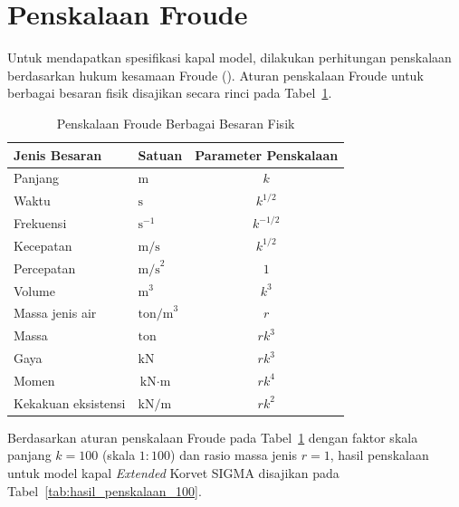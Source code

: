 \documentclass{article}
\providecommand{\parencite}[1]{(\cite{#1})}
\begin{document}
\section{Penskalaan Froude}

Untuk mendapatkan spesifikasi kapal model, dilakukan perhitungan penskalaan berdasarkan hukum kesamaan Froude \parencite{moreira2007path}. Aturan penskalaan Froude untuk berbagai besaran fisik disajikan secara rinci pada Tabel~\ref{tab:froude_scaling}.

\begin{table}[H]
\centering
\small
\caption{Penskalaan Froude Berbagai Besaran Fisik}
\label{tab:froude_scaling}
\begin{tabular}{llc}
\toprule
\textbf{Jenis Besaran} & \textbf{Satuan} & \textbf{Parameter Penskalaan} \\
\midrule
Panjang & $\text{m}$ & $k$ \\
Waktu & $\text{s}$ & $k^{1/2}$ \\
Frekuensi & $\text{s}^{-1}$ & $k^{-1/2}$ \\
Kecepatan & $\text{m/s}$ & $k^{1/2}$ \\
Percepatan & $\text{m/s}^2$ & $1$ \\
Volume & $\text{m}^3$ & $k^3$ \\
Massa jenis air & $\text{ton/m}^3$ & $r$ \\
Massa & $\text{ton}$ & $r k^3$ \\
Gaya & $\text{kN}$ & $r k^3$ \\
Momen & $\text{kN}\cdot\text{m}$ & $r k^4$ \\
Kekakuan eksistensi & $\text{kN/m}$ & $r k^2$ \\
\bottomrule
\end{tabular}
\end{table}

Berdasarkan aturan penskalaan Froude pada Tabel~\ref{tab:froude_scaling} dengan faktor skala panjang $k = 100$ (skala $1:100$) dan rasio massa jenis $r = 1$, hasil penskalaan untuk model kapal \textit{Extended} Korvet SIGMA disajikan pada Tabel~\ref{tab:hasil_penskalaan_100}.
\end{document}
